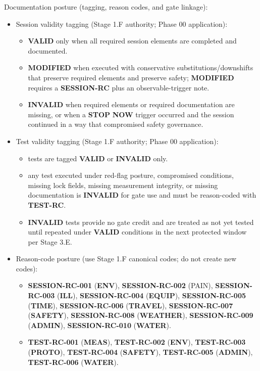 \documentclass[10pt]{article}
\begin{document}
Documentation posture (tagging, reason codes, and gate linkage):

\begin{itemize}
\item Session validity tagging (Stage 1.F authority; Phase 00 application):
  \begin{itemize}
  \item \textbf{VALID} only when all required session elements are completed and documented.
  \item \textbf{MODIFIED} when executed with conservative substitutions/downshifts that preserve required elements and preserve safety; \textbf{MODIFIED} requires a \textbf{SESSION-RC} plus an observable-trigger note.
  \item \textbf{INVALID} when required elements or required documentation are missing, or when a \textbf{STOP} \textbf{NOW} trigger occurred and the session continued in a way that compromised safety governance.
  \end{itemize}
\item Test validity tagging (Stage 1.F authority; Phase 00 application):
  \begin{itemize}
  \item tests are tagged \textbf{VALID} or \textbf{INVALID} only.
  \item any test executed under red-flag posture, compromised conditions, missing lock fields, missing measurement integrity, or missing documentation is \textbf{INVALID} for gate use and must be reason-coded with \textbf{TEST-RC}.
  \item \textbf{INVALID} tests provide no gate credit and are treated as not yet tested until repeated under \textbf{VALID} conditions in the next protected window per Stage 3.E.
  \end{itemize}
\item Reason-code posture (use Stage 1.F canonical codes; do not create new codes):
  \begin{itemize}
  \item \textbf{SESSION-RC-001} (\textbf{ENV}), \textbf{SESSION-RC-002} (PAIN), \textbf{SESSION-RC-003} (\textbf{ILL}), \textbf{SESSION-RC-004} (\textbf{EQUIP}), \textbf{SESSION-RC-005} (\textbf{TIME}), \textbf{SESSION-RC-006} (\textbf{TRAVEL}), \textbf{SESSION-RC-007} (\textbf{SAFETY}), \textbf{SESSION-RC-008} (\textbf{WEATHER}), \textbf{SESSION-RC-009} (\textbf{ADMIN}), \textbf{SESSION-RC-010} (\textbf{WATER}).
  \item \textbf{TEST-RC-001} (\textbf{MEAS}), \textbf{TEST-RC-002} (\textbf{ENV}), \textbf{TEST-RC-003} (\textbf{PROTO}), \textbf{TEST-RC-004} (\textbf{SAFETY}), \textbf{TEST-RC-005} (\textbf{ADMIN}), \textbf{TEST-RC-006} (\textbf{WATER}).

\end{itemize}
\end{itemize}
\end{document}
